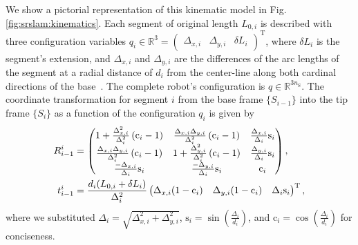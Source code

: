 
We show a pictorial representation of this kinematic model in Fig. \ref{fig:srslam:kinematics}. Each segment of original length $L_{0,i}$ is described with three configuration variables 
%
    $q_i \in \mathbb{R}^{3} = \begin{pmatrix}\Delta_{x,i} & \Delta_{y,i} & \delta L_i\end{pmatrix}^\mathrm{T}$,
where $\delta L_i$ is the segment's extension, and $\Delta_{x,i}$ and $\Delta_{y,i}$ are the differences of the arc lengths of the segment at a radial distance of $d_i$ from the center-line along both cardinal directions of the base~\citep{della2020improved}. The complete robot's configuration is $q \in \mathbb{R}^{3 n_{\mathrm{S}}}$. The coordinate transformation for segment $i$ from the base frame $\{ S_{i-1} \}$ into the tip frame $\{ S_{i} \}$ as a function of the configuration $q_i$ is given by~\citep{della2020improved}
\begin{equation}
\label{eq:srslam:transformation_improved_pcc}
\begin{split}
    R_{i-1}^{i} &= 
    \begin{pmatrix}
        1 + \frac{\Delta_{x,i}^2}{\Delta_{i}^2} \left ( \mathrm{c}_i - 1 \right ) & \frac{\Delta_{x,i} \Delta_{y,i}}{\Delta_{i}^2} \left ( \mathrm{c}_i - 1 \right ) & \frac{\Delta_{x,i}}{\Delta_i} \mathrm{s}_i\\
        \frac{\Delta_{x,i} \Delta_{y,i}}{\Delta_{i}^2} \left ( \mathrm{c}_i - 1 \right ) & 1 + \frac{\Delta_{y,i}^2}{\Delta_{i}^2} \left ( \mathrm{c}_i - 1 \right ) & \frac{\Delta_{y,i}}{\Delta_i} \mathrm{s}_i\\
        \frac{-\Delta_{x,i}}{\Delta_i} \mathrm{s}_i & \frac{-\Delta_{y,i}}{\Delta_i} \mathrm{s}_i & \mathrm{c}_i
    \end{pmatrix},\\
    \vspace{0.25em}
    t_{i-1}^{i} &= \frac{d_i ( L_{0,i}+\delta L_i)}{\Delta_i^2}
    \begin{pmatrix}
        \Delta_{x,i} (1 - \mathrm{c}_i) & \Delta_{y,i} (1 - \mathrm{c}_i) & \Delta_{i} \mathrm{s}_i
    \end{pmatrix}^{\mathrm{T}},
\end{split}
\end{equation}
where we substituted $\Delta_i = \sqrt{\Delta_{x,i}^2 + \Delta_{y,i}^2}$, $\mathrm{s}_i = \sin \left ( \frac{\Delta_i}{d_i} \right )$, and $\mathrm{c}_i = \cos \left ( \frac{\Delta_i}{d_i} \right )$ for conciseness.

